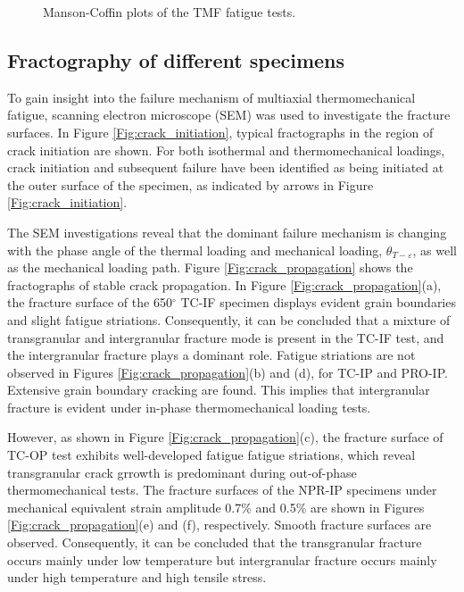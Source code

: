 \begin{figure}[!htp]
\caption{Manson-Coffin plots of the TMF fatigue tests.}
\label{Fig:plot_exp_fatigue_life}
\end{figure}

\subsection{Fractography of different specimens}
\noindent
To gain insight into the failure mechanism of multiaxial thermomechanical fatigue, scanning electron microscope (SEM) was used to investigate the fracture surfaces. In Figure \ref{Fig:crack_initiation}, typical fractographs in the region of crack initiation are shown. For both isothermal and thermomechanical loadings, crack initiation and subsequent failure have been identified as being initiated at the outer surface of the specimen, as indicated by arrows in Figure \ref{Fig:crack_initiation}. 

The SEM investigations reveal that the dominant failure mechanism is changing with the phase angle of the thermal loading and mechanical loading, $\theta_{T-\varepsilon}$, as well as the mechanical loading path.
Figure \ref{Fig:crack_propagation} shows the fractographs of stable crack propagation.
In Figure \ref{Fig:crack_propagation}(a), the fracture surface of the 650$^\circ$ TC-IF specimen displays evident grain boundaries and slight fatigue striations. Consequently, it can be concluded that a mixture of transgranular and intergranular fracture mode is present in the TC-IF test, and the intergranular fracture plays a dominant role.
Fatigue striations are not observed in Figures \ref{Fig:crack_propagation}(b) and (d), for TC-IP and PRO-IP. Extensive grain boundary cracking are found. This implies that intergranular fracture is evident under in-phase thermomechanical loading tests.

However, as shown in Figure \ref{Fig:crack_propagation}(c), the fracture surface of TC-OP test exhibits well-developed fatigue fatigue striations, which reveal transgranular crack grrowth is predominant during out-of-phase thermomechanical tests. 
The fracture surfaces of the NPR-IP specimens under mechanical equivalent strain amplitude 0.7\% and 0.5\% are shown in Figures \ref{Fig:crack_propagation}(e) and (f), respectively. Smooth fracture surfaces are observed.
Consequently, it can be concluded that the transgranular fracture occurs mainly under low temperature but intergranular fracture occurs mainly under high temperature and high tensile stress. 

